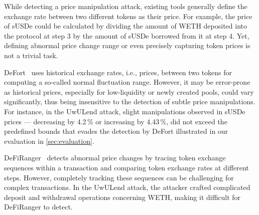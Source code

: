 While detecting a price manipulation attack, existing tools generally define the exchange rate between two different tokens as their price.
For example, the price of sUSDe could be calculated by dividing the amount of WETH deposited into the protocol at step 3 by the amount of sUSDe borrowed from it at step 4.
Yet, defining abnormal price change range or even precisely capturing token prices is not a trivial task.

\begin{compactitem}
\item DeFort~\cite{DeFort24} uses historical exchange rates, i.e., prices, between two tokens for computing a so-called normal fluctuation range. 
However, it may be error-prone as historical prices, especially for low-liquidity or newly created pools, could vary significantly, thus being insensitive to the detection of subtle price manipulations. 
For instance, in the UwULend attack, slight manipulations observed in sUSDe prices --- decreasing by 4.2\,\%  or increasing by 4.43\,\%, did not exceed the predefined bounds that evades the detection by DeFort illustrated in our evaluation in \mysec\ref{sec:evaluation}.

\item DeFiRanger~\cite{DeFiRanger23} detects abnormal price changes by tracing token exchange sequences within a transaction and comparing token exchange rates at different steps. 
However, completely tracking these sequences can be challenging for complex transactions. 
In the UwULend attack, the attacker crafted complicated deposit and withdrawal operations concerning WETH, making it difficult for DeFiRanger to detect.
\end{compactitem}

